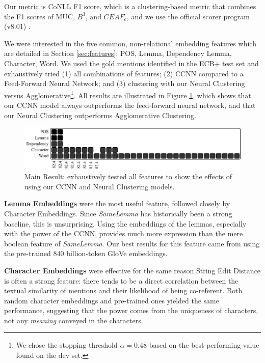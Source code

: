 \documentclass[11pt,a4paper]{article}
\begin{document}
Our metric is CoNLL F1 score, which is a clustering-based metric that combines the F1 scores of MUC, $B^{3}$, and $CEAF_{e}$, and we use the official scorer program (v8.01) \cite{Pradhan+etal:14a}.


We were interested in the five common, non-relational embedding features which are detailed in Section \ref{sec:features}: POS, Lemma, Dependency Lemma, Character, Word.  We used the gold mentions identified in the ECB+ test set and exhaustively tried (1) all combinations of features; (2) CCNN compared to a Feed-Forward Neural Network; and (3) clustering with our Neural Clustering versus Agglomerative\footnote{We chose the stopping threshold $\alpha=0.48$ based on the best-performing value found on the dev set.}.  All results are illustrated in Figure \ref{fig:allfeatures}, which shows that our CCNN model always outperforms the feed-forward neural network, and that our Neural Clustering outperforms Agglomerative Clustering.

\begin{figure}[h]
\label{fig:allfeatures}
\centering
    \includegraphics[width=1\textwidth]{features.pdf}
\caption{Main Result: exhaustively tested all features to show the effects of using our CCNN and Neural Clustering models.}
\end{figure}

\textbf{Lemma Embeddings} were the most useful feature, followed closely by Character Embeddings.  Since \textit{SameLemma} has historically been a strong baseline, this is unsurprising.  Using the embeddings of the lemmas, especially with the power of the CCNN, provides much more expression than the mere boolean feature of \textit{SameLemma}.  Our best results for this feature came from using the pre-trained 840 billion-token GloVe embeddings.

\textbf{Character Embeddings} were effective for the same reason String Edit Distance is often a strong feature: there tends to be a direct correlation between the textual similarity of mentions and their likelihood of being co-referent. Both random character embeddings and pre-trained ones yielded the same performance, suggesting that the power comes from the uniqueness of characters, not any \textit{meaning} conveyed in the characters.
\end{document}

